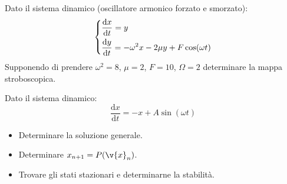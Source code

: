\begin{ex}[]
    Dato il sistema dinamico (oscillatore armonico forzato e smorzato):
    \[
    \begin{dcases}
    \frac{\text{d} x}{\text{d} t} = y\\
    \frac{\text{d} y}{\text{d} t} = -\omega^2x-2\mu y + F\cos (\omega t) 
    \end{dcases}
    \]
    Supponendo di prendere $\omega^2 = 8$, $\mu =2$, $F=10$, $\Omega =2$ determinare la mappa stroboscopica.
\end{ex}
\noindent
\begin{ex}[]
    Dato il sistema dinamico:
    \[
	\frac{\text{d} x}{\text{d} t} = - x + A \sin (\omega t) 
    \]
    \begin{itemize}
        \item Determinare la soluzione generale.
	\item Determinare $x_{n+1}= P(\v{x}_n)$.
	\item Trovare gli stati stazionari e determinarne la stabilità.
    \end{itemize}
\end{ex}
\noindent
